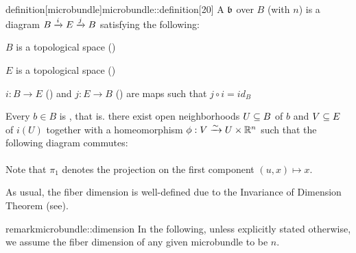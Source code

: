\begin{mystatement}{definition}[microbundle]{microbundle::definition}[20] A  $\bb$ over $B$ (with  $n$) is a diagram $\bundle{B}{E}{i}{j}$ satisfying the following: \begin{properties} \item $B$ is a topological space () \item $E$ is a topological space () \item $i: B \to E$ () and $j: E \to B$ () are maps such that $j \circ i = id_B$ \item Every $b \in B$ is , that is. there exist open neighborhoods $U \sub B$ of $b$ and $V \sub E$ of $i(U)$ together with a homeomorphism $\phi: V \isomto U \cross \R^n$ such that the following diagram commutes: \[ \begin{tikzcd}[column sep=tiny] \end{tikzcd} \] Note that $\pi_1$ denotes the projection on the first component $(u, x) \mapsto x$. \end{properties} \end{mystatement}

As usual, the fiber dimension is well-defined due to the Invariance of Dimension Theorem (see\cite[cor.19.10]{brendon}). \begin{mystatement}{remark}{microbundle::dimension} In the following, unless explicitly stated otherwise, we assume the fiber dimension of any given microbundle to be $n$. \end{mystatement}